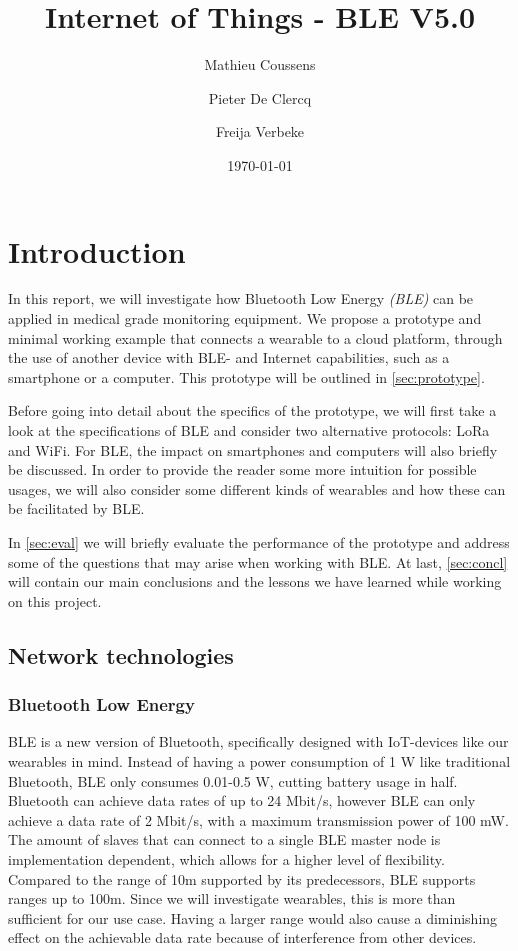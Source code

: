 \documentclass[12pt, a4paper]{article}
\title{Internet of Things - BLE V5.0}
\author{Mathieu Coussens \and Pieter De Clercq \and Freija Verbeke}
\date{\today}
\newcommand{\lora}{LoRa}
\newcommand{\bluetooth}{Bluetooth}
\newcommand{\ble}{\bluetooth{} Low Energy}
\newcommand{\wifi}{WiFi}
\newcommand{\bles}{BLE}
\newcommand{\iot}{IoT}
\begin{document}

\maketitle
\newpage
\tableofcontents

\newpage
{}
\setcounter{page}{1}

\section{Introduction}
In this report, we will investigate how \ble{} \emph{(\bles)} can be applied in medical grade monitoring equipment. We propose a prototype and minimal working example that connects a wearable to a cloud platform, through the use of another device with \bles{}- and Internet capabilities, such as a smartphone or a computer. This prototype will be outlined in \autoref{sec:prototype}.

Before going into detail about the specifics of the prototype, we will first take a look at the specifications of \bles{} and consider two alternative protocols: \lora{} and \wifi{}. For \bles{}, the impact on smartphones and computers will also briefly be discussed. In order to provide the reader some more intuition for possible usages, we will also consider some different kinds of wearables and how these can be facilitated by \bles{}.

In \autoref{sec:eval} we will briefly evaluate the performance of the prototype and address some of the questions that may arise when working with \bles{}. At last, \autoref{sec:concl} will contain our main conclusions and the lessons we have learned while working on this project.

\subsection{Network technologies}
\subsubsection{\ble{}}
\bles{} is a new version of Bluetooth, specifically designed with \iot{}-devices like our wearables in mind. Instead of having a power consumption of 1 W like traditional \bluetooth{}, \bles{} only consumes 0.01-0.5 W, cutting battery usage in half. Bluetooth can achieve data rates of up to 24 Mbit/s, however \bles{} can only achieve a data rate of 2 Mbit/s, with a maximum transmission power of 100 mW. The amount of slaves that can connect to a single \bles{} master node is implementation dependent, which allows for a higher level of flexibility. Compared to the range of 10m supported by its predecessors, \bles{} supports ranges up to 100m. Since we will investigate wearables, this is more than sufficient for our use case. Having a larger range would also cause a diminishing effect on the achievable data rate because of interference from other devices.
\end{document}
